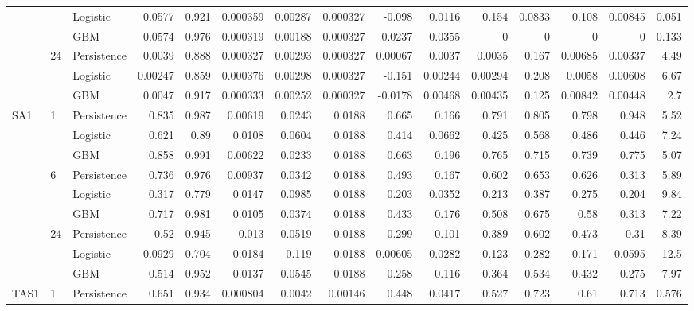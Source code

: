 \begin{tabular}{lllrrrrrrrrrrrr}
 &  & Logistic & 0.0577 & 0.921 & 0.000359 & 0.00287 & 0.000327 & -0.098 & 0.0116 & 0.154 & 0.0833 & 0.108 & 0.00845 & 0.051 \\
 &  & GBM & 0.0574 & 0.976 & 0.000319 & 0.00188 & 0.000327 & 0.0237 & 0.0355 & 0 & 0 & 0 & 0 & 0.133 \\
\cline{2-15}
 & \multirow[t]{3}{*}{24} & Persistence & 0.0039 & 0.888 & 0.000327 & 0.00293 & 0.000327 & 0.00067 & 0.0037 & 0.0035 & 0.167 & 0.00685 & 0.00337 & 4.49 \\
 &  & Logistic & 0.00247 & 0.859 & 0.000376 & 0.00298 & 0.000327 & -0.151 & 0.00244 & 0.00294 & 0.208 & 0.0058 & 0.00608 & 6.67 \\
 &  & GBM & 0.0047 & 0.917 & 0.000333 & 0.00252 & 0.000327 & -0.0178 & 0.00468 & 0.00435 & 0.125 & 0.00842 & 0.00448 & 2.7 \\
\cline{1-15} \cline{2-15}
\multirow[t]{9}{*}{SA1} & \multirow[t]{3}{*}{1} & Persistence & 0.835 & 0.987 & 0.00619 & 0.0243 & 0.0188 & 0.665 & 0.166 & 0.791 & 0.805 & 0.798 & 0.948 & 5.52 \\
 &  & Logistic & 0.621 & 0.89 & 0.0108 & 0.0604 & 0.0188 & 0.414 & 0.0662 & 0.425 & 0.568 & 0.486 & 0.446 & 7.24 \\
 &  & GBM & 0.858 & 0.991 & 0.00622 & 0.0233 & 0.0188 & 0.663 & 0.196 & 0.765 & 0.715 & 0.739 & 0.775 & 5.07 \\
\cline{2-15}
 & \multirow[t]{3}{*}{6} & Persistence & 0.736 & 0.976 & 0.00937 & 0.0342 & 0.0188 & 0.493 & 0.167 & 0.602 & 0.653 & 0.626 & 0.313 & 5.89 \\
 &  & Logistic & 0.317 & 0.779 & 0.0147 & 0.0985 & 0.0188 & 0.203 & 0.0352 & 0.213 & 0.387 & 0.275 & 0.204 & 9.84 \\
 &  & GBM & 0.717 & 0.981 & 0.0105 & 0.0374 & 0.0188 & 0.433 & 0.176 & 0.508 & 0.675 & 0.58 & 0.313 & 7.22 \\
\cline{2-15}
 & \multirow[t]{3}{*}{24} & Persistence & 0.52 & 0.945 & 0.013 & 0.0519 & 0.0188 & 0.299 & 0.101 & 0.389 & 0.602 & 0.473 & 0.31 & 8.39 \\
 &  & Logistic & 0.0929 & 0.704 & 0.0184 & 0.119 & 0.0188 & 0.00605 & 0.0282 & 0.123 & 0.282 & 0.171 & 0.0595 & 12.5 \\
 &  & GBM & 0.514 & 0.952 & 0.0137 & 0.0545 & 0.0188 & 0.258 & 0.116 & 0.364 & 0.534 & 0.432 & 0.275 & 7.97 \\
\cline{1-15} \cline{2-15}
\multirow[t]{9}{*}{TAS1} & \multirow[t]{3}{*}{1} & Persistence & 0.651 & 0.934 & 0.000804 & 0.0042 & 0.00146 & 0.448 & 0.0417 & 0.527 & 0.723 & 0.61 & 0.713 & 0.576 \\

\end{tabular}

